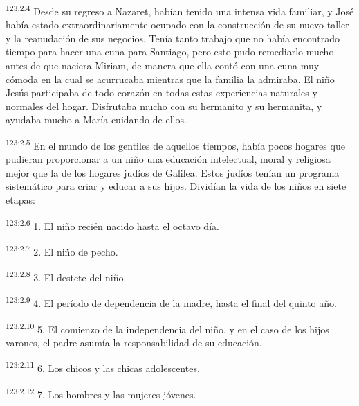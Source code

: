 \par 
\textsuperscript{123:2.4} Desde su regreso a Nazaret, habían tenido una intensa vida familiar, y José había estado extraordinariamente ocupado con la construcción de su nuevo taller y la reanudación de sus negocios. Tenía tanto trabajo que no había encontrado tiempo para hacer una cuna para Santiago, pero esto pudo remediarlo mucho antes de que naciera Miriam, de manera que ella contó con una cuna muy cómoda en la cual se acurrucaba mientras que la familia la admiraba. El niño Jesús participaba de todo corazón en todas estas experiencias naturales y normales del hogar. Disfrutaba mucho con su hermanito y su hermanita, y ayudaba mucho a María cuidando de ellos.

\par 
\textsuperscript{123:2.5} En el mundo de los gentiles de aquellos tiempos, había pocos hogares que pudieran proporcionar a un niño una educación intelectual, moral y religiosa mejor que la de los hogares judíos de Galilea. Estos judíos tenían un programa sistemático para criar y educar a sus hijos. Dividían la vida de los niños en siete etapas:

\par 
\textsuperscript{123:2.6} 1. El niño recién nacido hasta el octavo día.

\par 
\textsuperscript{123:2.7} 2. El niño de pecho.

\par 
\textsuperscript{123:2.8} 3. El destete del niño.

\par 
\textsuperscript{123:2.9} 4. El período de dependencia de la madre, hasta el final del quinto año.

\par 
\textsuperscript{123:2.10} 5. El comienzo de la independencia del niño, y en el caso de los hijos varones, el padre asumía la responsabilidad de su educación.

\par 
\textsuperscript{123:2.11} 6. Los chicos y las chicas adolescentes.

\par 
\textsuperscript{123:2.12} 7. Los hombres y las mujeres jóvenes.

